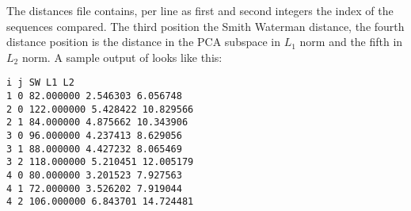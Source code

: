 The distances file contains, per line as first and second integers the
index of the sequences compared. The third position
the Smith Waterman distance, the fourth distance position is the
distance in the PCA subspace in $L_1$ norm and the fifth in $L_2$
norm.
A sample output of looks like this:
\begin{lstlisting}
i j SW L1 L2
1 0 82.000000 2.546303 6.056748
2 0 122.000000 5.428422 10.829566
2 1 84.000000 4.875662 10.343906
3 0 96.000000 4.237413 8.629056
3 1 88.000000 4.427232 8.065469
3 2 118.000000 5.210451 12.005179
4 0 80.000000 3.201523 7.927563
4 1 72.000000 3.526202 7.919044
4 2 106.000000 6.843701 14.724481
\end{lstlisting}


